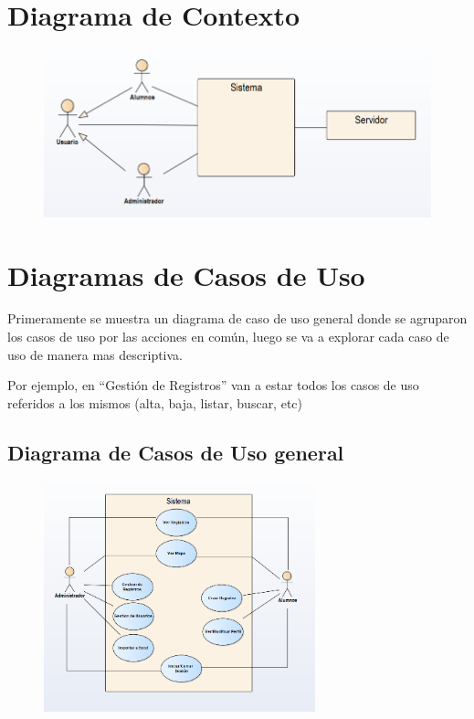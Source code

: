 	\section{Diagrama de Contexto}

	\begin{figure}[H]
	\centering
		
		\includegraphics[width=1\textwidth]{imagenes/analisis/diagrama-contexto.png}
		\label{fig:casos-de-uso}
	\end{figure}

	\section{Diagramas de Casos de Uso}

	Primeramente se muestra un diagrama de caso de uso general donde se agruparon los casos de uso por las acciones en común, luego se va a explorar cada caso de uso de manera mas descriptiva.

	Por ejemplo, en ``Gestión de Registros'' van a estar todos los casos de uso referidos a los mismos (alta, baja, listar, buscar, etc)

	\subsection{Diagrama de Casos de Uso general}

	\begin{figure}[H]
	\centering
		\includegraphics[width=0.7\textwidth]{imagenes/analisis/casos-uso-general.png}
		\label{fig:casos-de-uso}
	\end{figure}

